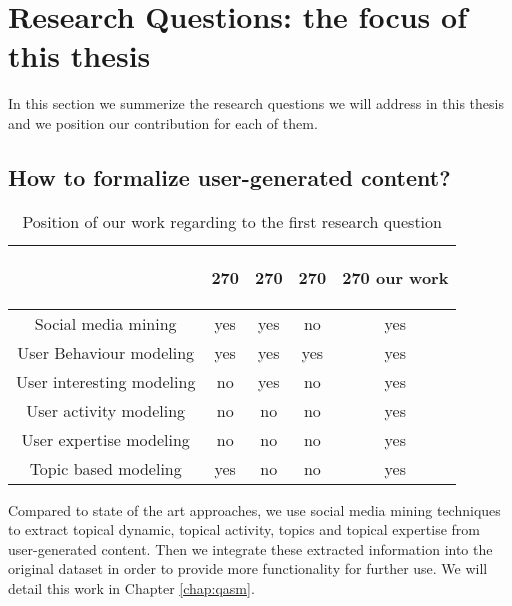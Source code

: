 \section{Research Questions: the focus of this thesis}
In this section we summerize the research questions we will address in this thesis and we position our contribution for each of them. 

\subsection{How to formalize user-generated content?}
    
    \begin{table}[htp]
        \centering
        \begin{tabular}{c c c c c}
        &
        \begin{turn}{270}
            \cite{chp2socialsemanticminingDBLP:series/synthesis/2015Omitola} \end{turn} 
        &
        \begin{turn}{270} 
            \cite{chp2siocontoDBLP:conf/atal/PassantBBD09}
        \end{turn}
        &
        \begin{turn}{270} 
            \cite{chp2usermodelingplumbaum2015user}
        \end{turn}
        &
        \begin{turn}{270}
        our work
        \end{turn}
        \\ \hline
        Social media mining & yes & yes & no & yes \\ \hline
        User Behaviour modeling & yes & yes & yes &yes \\ \hline
        User interesting modeling & no &yes & no & yes\\ \hline
        User activity modeling & no & no & no & yes\\ \hline
        User expertise modeling & no & no & no & yes \\ \hline
        Topic based modeling & yes & no & no &yes \\ \hline
        \end{tabular}
        \caption{Position of our work regarding to the first research question}
        \label{tab:rq1compare}
    \end{table}
Compared to state of the art approaches, we use social media mining techniques to extract topical dynamic, topical activity, topics and topical expertise from user-generated content. Then we integrate these extracted information into the original dataset in order to provide more functionality for further use. We will detail this work in Chapter \ref{chap:qasm}. 
    


